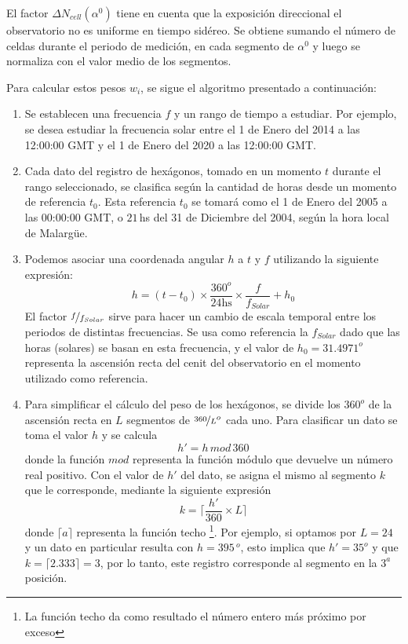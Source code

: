 El factor $\Delta N _{cell}(\alpha^0)$ tiene en cuenta que la exposición  direccional  el observatorio no es uniforme en tiempo sidéreo.  Se obtiene sumando el número de celdas durante el periodo de medición, en cada segmento de $\alpha^0$ y luego se normaliza con el valor medio de los segmentos.

Para calcular estos pesos $w_i$, se sigue el algoritmo presentado a continuación:
     
      \begin{enumerate}
        \item Se establecen una frecuencia $f$  y un rango de tiempo a estudiar. Por ejemplo, se desea estudiar la frecuencia solar entre el 1 de Enero del 2014 a las 12:00:00 GMT y el 1 de Enero del 2020 a las 12:00:00 GMT.

        \item Cada dato del registro de hexágonos, tomado en un momento $t$ durante el rango seleccionado, se clasifica según la cantidad de horas desde un momento de referencia $t_0$. Esta referencia $t_0$ se tomará como el 1 de Enero del 2005 a las 00:00:00 GMT, o  $21\,$hs del 31 de Diciembre del 2004, según la hora local de Malargüe.

        \item Podemos asociar una coordenada angular $h$ a $t$  y $f$  utilizando la siguiente expresión:
         \begin{equation}
          h = (t-t_0) \times \frac{360^o}{24\text{hs}} \times\frac{f}{f_{Solar}} + h_0
          \label{eq:h_horas} 
        \end{equation}
        El factor $\nicefrac{f}{f_{Solar}}$ sirve para hacer un cambio de escala temporal entre los periodos de distintas frecuencias. Se usa como referencia la $f_{Solar}$ dado que las horas (solares) se basan en esta frecuencia, y el valor de $h_0=31.4971^o$ representa la ascensión recta del cenit del observatorio en el momento utilizado como referencia.
        
        \item  Para simplificar el cálculo del peso de los hexágonos, se divide los $360^o$ de la ascensión recta en $L$ segmentos de $\nicefrac{360}{L} ^o$ cada uno. Para clasificar un dato se  toma  el valor $h$  y se calcula
        \begin{equation}
          h' = h\, mod \,360 %
          \label{eq:h_primado}
        \end{equation}
        donde la función $mod$ representa la función módulo que devuelve un número real positivo. Con el valor de $h'$ del dato, se asigna el mismo al segmento $k$ que le corresponde, mediante la siguiente expresión
        \begin{equation}
          k = \bigg \lceil \frac{h'}{360}\times L \bigg \rceil
        \end{equation}
        donde $\lceil a \rceil$ representa la función techo \footnote{La función techo da como resultado el número entero más próximo por exceso}. Por ejemplo, si optamos por $L=24$ y un dato en particular resulta con  $h=395\,^o$, esto implica que $h'= 35^o$ y que $k=\lceil 2.333 \rceil=3$, por lo tanto, este registro corresponde al segmento en la $3^{a}$ posición.


\end{enumerate}
